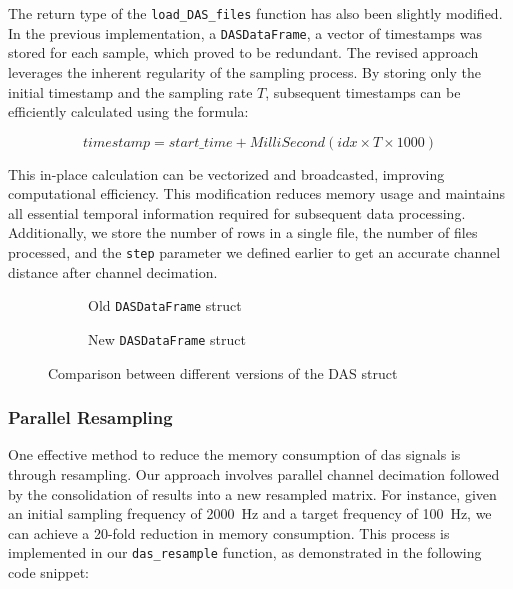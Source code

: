 The return type of the \texttt{load\_DAS\_files} function has also been slightly modified. In the previous implementation, a \texttt{DASDataFrame}, a vector of timestamps was stored for each sample, which proved to be redundant. The revised approach leverages the inherent regularity of the sampling process. By storing only the initial timestamp and the sampling rate $T$, subsequent timestamps can be efficiently calculated using the formula:

$$timestamp = start\_time + MilliSecond(idx \times T \times 1000)$$

This in-place calculation can be vectorized and broadcasted, improving computational efficiency. This modification reduces memory usage and maintains all essential temporal information required for subsequent data processing. Additionally, we store the number of rows in a single file, the number of files processed, and the \texttt{step} parameter we defined earlier to get an accurate channel distance after channel decimation.\\

\begin{figure}[!h]
\centering
\begin{subfigure}{.45\textwidth}
  \centering
  
  \caption{Old \texttt{DASDataFrame} struct}
  \label{fig:olddasstc}
\end{subfigure}%
\hfill
\begin{subfigure}{.45\textwidth}
  \centering
  
  \caption{New \texttt{DASDataFrame} struct}
  \label{fig:newdasstc}
\end{subfigure}
\caption{Comparison between different versions of the DAS struct}
\label{fig:dasstccmp}
\end{figure}



\subsubsection{Parallel Resampling}

One effective method to reduce the memory consumption of \acrshort{das} signals is through resampling. Our approach involves parallel channel decimation followed by the consolidation of results into a new resampled matrix. For instance, given an initial sampling frequency of \qty{2000}{\hertz} and a target frequency of \qty{100}{\hertz}, we can achieve a 20-fold reduction in memory consumption. This process is implemented in our \texttt{das\_resample} function, as demonstrated in the following code snippet:


